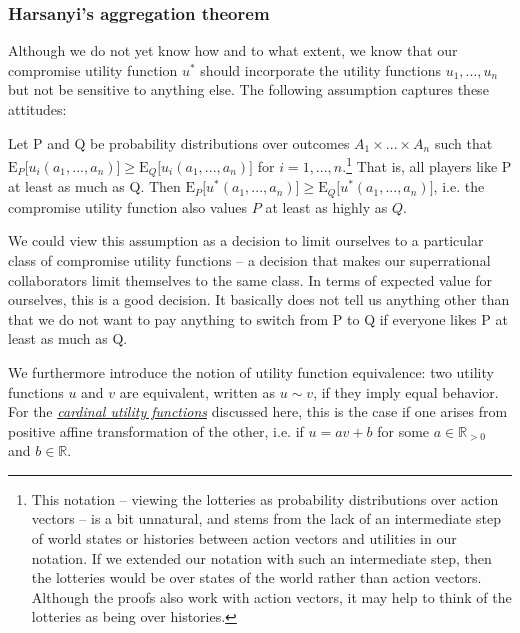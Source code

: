\subsubsection{Harsanyi's aggregation
theorem}\label{harsanyis-aggregation-theorem}

Although we do not yet know how and to what extent, we know that our
compromise utility function \(u^{*}\) should incorporate the utility
functions \(u_{1},...,u_{n}\) but not be sensitive to anything else. The
following assumption captures these attitudes:

\vspace{3mm}

\begin{assumption}
\label{ass:compromise_util}
Let P and Q be probability distributions over outcomes \(A_{1} \times
\text{...} \times A_{n}\) such that \(\mathrm{E}_{P}\lbrack u_{i}(a_{1},...,a_{n})\rbrack \geq
\mathrm{E}_{Q}\lbrack u_{i}(a_{1},...,a_{n})\rbrack\) for \(i = 1,...,n\).\footnote{This notation --
    viewing the lotteries as probability distributions over action vectors -- is a bit unnatural,
    and stems from the lack of an intermediate step of world states or histories between action
    vectors and utilities in our notation. If we extended our notation with such an intermediate
    step, then the lotteries would be over states of the world rather than action vectors. Although
the proofs also work with action vectors, it may help to think of the lotteries as being over
histories.} That is, all players like P at least as much as Q. Then \(\mathrm{E}_{P}\lbrack
u^{*}(a_{1},...,a_{n})\rbrack \geq \mathrm{E}_{Q}\lbrack u^{*}(a_{1},...,a_{n})\rbrack\), i.e. the
compromise utility function also values \(P\) at least as highly as \(Q\).
\end{assumption}

We could view this assumption as a decision to limit ourselves to a
particular class of compromise utility functions -- a decision that
makes our superrational collaborators limit themselves to the same
class. In terms of expected value for ourselves, this is a good
decision. It basically does not tell us anything other than that we do
not want to pay anything to switch from P to Q if everyone likes P at
least as much as Q.

We furthermore introduce the notion of utility function equivalence: two
utility functions \(u\) and \(v\) are equivalent, written as
\(u \sim v\), if they imply equal behavior. For the
\href{https://en.wikipedia.org/wiki/Cardinal_utility}{\emph{cardinal
utility functions}} discussed here, this is the case if one arises from
positive affine transformation of the other, i.e. if \(u = av + b\) for
some \(a \in \mathbb{R}_{> 0}\) and \(b \in \mathbb{R}\).

